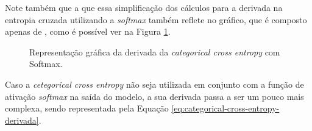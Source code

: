 Note também que a que essa simplificação dos cálculos para a derivada na entropia cruzada utilizando a \textit{softmax} também reflete no gráfico, que é composto apenas de , como é possível ver na Figura \ref{fig:categorical-cross-entropy-derivada-com-softmax}.

\begin{figure}[h!]
    \centering
    \caption{Representação gráfica da derivada da \textit{categorical cross entropy} com Softmax.}
    \label{fig:categorical-cross-entropy-derivada-com-softmax}
\end{figure}

Caso a \textit{cetegorical cross entropy} não seja utilizada em conjunto com a função de ativação \textit{softmax} na saída do modelo, a sua derivada passa a ser um pouco mais complexa, sendo representada pela Equação \ref{eq:categorical-cross-entropy-derivada}.

